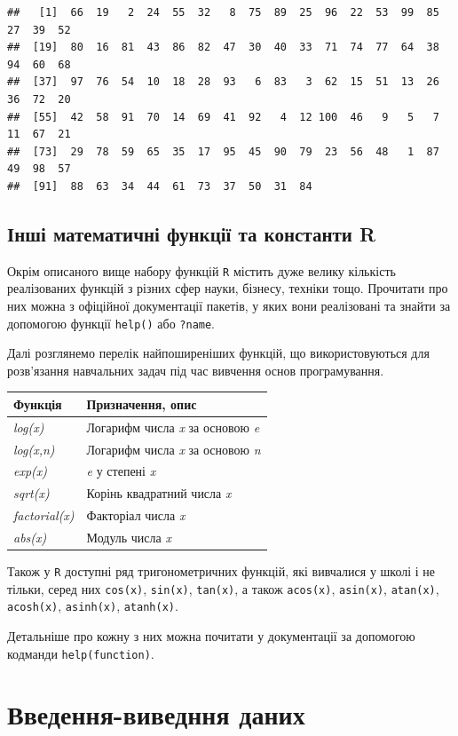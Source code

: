 \documentclass[
]{book}
\begin{document}
\begin{verbatim}
##   [1]  66  19   2  24  55  32   8  75  89  25  96  22  53  99  85  27  39  52
##  [19]  80  16  81  43  86  82  47  30  40  33  71  74  77  64  38  94  60  68
##  [37]  97  76  54  10  18  28  93   6  83   3  62  15  51  13  26  36  72  20
##  [55]  42  58  91  70  14  69  41  92   4  12 100  46   9   5   7  11  67  21
##  [73]  29  78  59  65  35  17  95  45  90  79  23  56  48   1  87  49  98  57
##  [91]  88  63  34  44  61  73  37  50  31  84
\end{verbatim}

\hypertarget{chapter244}{%
\subsection{Інші математичні функції та константи R}\label{chapter244}}

Окрім описаного вище набору функцій \texttt{R} містить дуже велику кількість реалізованих функцій з різних сфер науки, бізнесу, техніки тощо. Прочитати про них можна з офіційної документації пакетів, у яких вони реалізовані та знайти за допомогою функції \texttt{help()} або \texttt{?name}.

Далі розглянемо перелік найпоширеніших функцій, що використовуються для розв'язання навчальних задач під час вивчення основ програмування.

\begin{longtable}[]{@{}ll@{}}
\toprule
Функція & Призначення, опис\tabularnewline
\midrule
\endhead
\emph{log(x)} & Логарифм числа \emph{x} за основою \emph{e}\tabularnewline
\emph{log(x,n)} & Логарифм числа \emph{x} за основою \emph{n}\tabularnewline
\emph{exp(x)} & \emph{e} у степені \emph{x}\tabularnewline
\emph{sqrt(x)} & Корінь квадратний числа \emph{x}\tabularnewline
\emph{factorial(x)} & Факторіал числа \emph{x}\tabularnewline
\emph{abs(x)} & Модуль числа \emph{x}\tabularnewline
\bottomrule
\end{longtable}

Також у \texttt{R} доступні ряд тригонометричних функцій, які вивчалися у школі і не тільки, серед них \texttt{cos(x)}, \texttt{sin(x)}, \texttt{tan(x)}, а також \texttt{acos(x)}, \texttt{asin(x)}, \texttt{atan(x)}, \texttt{acosh(x)}, \texttt{asinh(x)}, \texttt{atanh(x)}.

Детальніше про кожну з них можна почитати у документації за допомогою кодманди \texttt{help(function)}.

\hypertarget{chapter245}{%
\section{Введення-виведння даних}\label{chapter245}}
\end{document}
